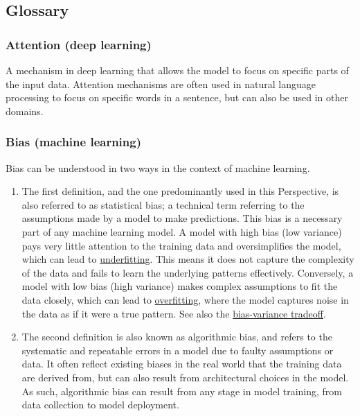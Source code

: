 \hypertarget{glossary}{%
\subsection{Glossary}\label{glossary}}

\hypertarget{attention-deep-learning}{%
\subsubsection{Attention (deep learning)}\label{attention-deep-learning}}

A mechanism in deep learning that allows the model to focus on specific parts of the input data.
Attention mechanisms are often used in natural language processing to focus on specific words in a sentence, but can also be used in other domains.

\hypertarget{bias-machine-learning}{%
\subsubsection{Bias (machine learning)}\label{bias-machine-learning}}

Bias can be understood in two ways in the context of machine learning.

\begin{enumerate}
\def\labelenumi{\arabic{enumi}.}
\item
  The first definition, and the one predominantly used in this Perspective, is also referred to as statistical bias; a technical term referring to the assumptions made by a model to make predictions.
  This bias is a necessary part of any machine learning model.
  A model with high bias (low variance) pays very little attention to the training data and oversimplifies the model, which can lead to \protect\hyperlink{underfitting}{underfitting}.
  This means it does not capture the complexity of the data and fails to learn the underlying patterns effectively.
  Conversely, a model with low bias (high variance) makes complex assumptions to fit the data closely, which can lead to \protect\hyperlink{overfitting}{overfitting}, where the model captures noise in the data as if it were a true pattern.
  See also the \protect\hyperlink{bias-variance-tradeoff}{bias-variance tradeoff}.
\item
  The second definition is also known as algorithmic bias, and refers to the systematic and repeatable errors in a model due to faulty assumptions or data.
  It often reflect existing biases in the real world that the training data are derived from, but can also result from architectural choices in the model.
  As such, algorithmic bias can result from any stage in model training, from data collection to model deployment.
\end{enumerate}

